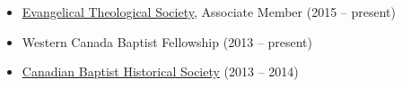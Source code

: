 
\begin{itemize}
\item \href{http://www.etsjets.org/}{Evangelical Theological Society}, Associate Member (2015 -- present)
\item Western Canada Baptist Fellowship (2013 -- present)
\item \href{https://www.facebook.com/canadianbaptisthistory}{Canadian Baptist Historical Society} (2013 -- 2014)
\end{itemize}

